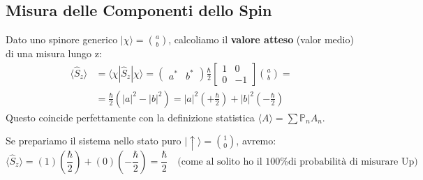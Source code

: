\documentclass[11pt, a4paper]{article}
\begin{document}
\subsection{Misura delle Componenti dello Spin} %

Dato uno spinore generico $|\chi\rangle = \binom{a}{b}$, calcoliamo il \textbf{valore atteso} (valor medio) di una misura lungo z: %
\begin{align*}
    \langle \hat{S}_z \rangle &= \langle \chi | \hat{S}_z | \chi \rangle = \begin{pmatrix} a^* & b^* \end{pmatrix} \frac{\hbar}{2} \begin{bmatrix} 1 & 0 \\ 0 & -1 \end{bmatrix} \binom{a}{b} = \\ %
    &= \frac{\hbar}{2} (|a|^2 - |b|^2) = |a|^2 \left(+\frac{\hbar}{2}\right) + |b|^2 \left(-\frac{\hbar}{2}\right) %
\end{align*}
Questo coincide perfettamente con la definizione statistica $\langle A \rangle = \sum \mathbb{P}_n A_n$. %

\noindent
Se prepariamo il sistema nello stato puro $|\uparrow\rangle = \binom{1}{0}$, avremo: %
\begin{equation*}
    \langle \hat{S}_z \rangle = (1)\left(\frac{\hbar}{2}\right) + (0)\left(-\frac{\hbar}{2}\right) = \frac{\hbar}{2} \quad \text{(come al solito ho il 100\% di probabilità di misurare Up)} %
\end{equation*}
\end{document}
